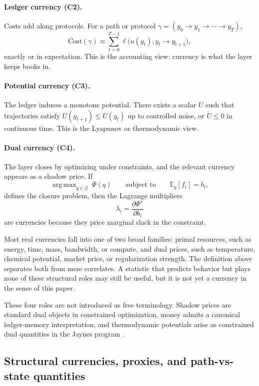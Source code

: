 \documentclass[11pt,a4paper]{article}
\newcommand{\E}{\mathbb{E}}
\DeclareMathOperator*{\argmax}{arg\,max}
\begin{document}
\paragraph{Ledger currency (C2).}
Costs add along protocols. For a path or protocol \(\gamma=(y_0\to y_1\to\cdots\to y_T)\),
\[
\mathrm{Cost}(\gamma)\approx \sum_{t=0}^{T-1}\ell\big(u(y_t),y_t\to y_{t+1}\big),
\]
exactly or in expectation. This is the accounting view: currency is what the layer keeps books in.

\paragraph{Potential currency (C3).}
The ledger induces a monotone potential. There exists a scalar \(U\) such that trajectories satisfy \(U(y_{t+1})\le U(y_t)\) up to controlled noise, or \(\dot U\le 0\) in continuous time. This is the Lyapunov or thermodynamic view.

\paragraph{Dual currency (C4).}
The layer closes by optimizing under constraints, and the relevant currency appears as a shadow price. If
\[
\argmax_{q\in\mathcal Q}\ \Phi(q)\qquad \text{subject to}\qquad \E_q[f_i]=b_i,
\]
defines the closure problem, then the Lagrange multipliers
\[
\lambda_i=\frac{\partial \Phi^\star}{\partial b_i}
\]
are currencies because they price marginal slack in the constraint.

Most real currencies fall into one of two broad families: primal resources, such as energy, time, mass, bandwidth, or compute, and dual prices, such as temperature, chemical potential, market price, or regularization strength. The definition above separates both from mere correlates. A statistic that predicts behavior but plays none of these structural roles may still be useful, but it is not yet a currency in the sense of this paper.

These four roles are not introduced as free terminology. Shadow prices are standard dual objects in constrained optimization, money admits a canonical ledger-memory interpretation, and thermodynamic potentials arise as constrained dual quantities in the Jaynes program \cite{boyd2004convex,kocherlakota1998money,jaynes1957information}.

\subsection{Structural currencies, proxies, and path-vs-state quantities}
\end{document}
